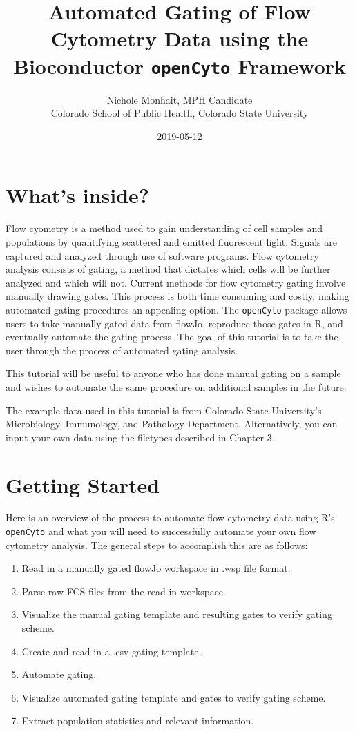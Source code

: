 \documentclass[]{book}
\title{Automated Gating of Flow Cytometry Data using the Bioconductor \texttt{openCyto} Framework}
\author{Nichole Monhait, MPH Candidate \\ Colorado School of Public Health, Colorado State University}
\date{2019-05-12}
\providecommand{\tightlist}{%
  \setlength{\itemsep}{0pt}\setlength{\parskip}{0pt}}
\begin{document}
\maketitle

{
\setcounter{tocdepth}{1}
\tableofcontents
}
\hypertarget{whats-inside}{%
\chapter{What's inside?}\label{whats-inside}}

Flow cyometry is a method used to gain understanding of cell samples and populations by quantifying scattered and emitted fluorescent light. Signals are captured and analyzed through use of software programs. Flow cytometry analysis consists of gating, a method that dictates which cells will be further analyzed and which will not. Current methods for flow cytometry gating involve manually drawing gates. This process is both time consuming and costly, making automated gating procedures an appealing option. The \texttt{openCyto} package allows users to take manually gated data from flowJo, reproduce those gates in R, and eventually automate the gating process. The goal of this tutorial is to take the user through the process of automated gating analysis.

This tutorial will be useful to anyone who has done manual gating on a sample and wishes to automate the same procedure on additional samples in the future.

The example data used in this tutorial is from Colorado State University's Microbiology, Immunology, and Pathology Department. Alternatively, you can input your own data using the filetypes described in Chapter 3.

\hypertarget{getting-started}{%
\chapter{Getting Started}\label{getting-started}}

Here is an overview of the process to automate flow cytometry data using R's \texttt{openCyto} and what you will need to successfully automate your own flow cytometry analysis. The general steps to accomplish this are as follows:

\begin{enumerate}
\def\labelenumi{\arabic{enumi}.}
\tightlist
\item
  Read in a manually gated flowJo workspace in .wsp file format.
\item
  Parse raw FCS files from the read in workspace.
\item
  Visualize the manual gating template and resulting gates to verify gating scheme.
\item
  Create and read in a .csv gating template.
\item
  Automate gating.
\item
  Visualize automated gating template and gates to verify gating scheme.
\item
  Extract population statistics and relevant information.
\end{enumerate}
\end{document}
